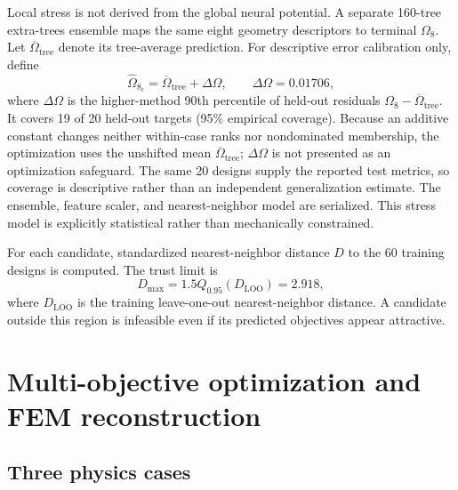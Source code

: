 \documentclass[11pt]{article}
\newcommand{\Om}{\Omega_{8}}
\begin{document}
Local stress is not derived from the global neural potential. A separate 160-tree extra-trees ensemble maps the same eight geometry descriptors to terminal $\Om$. Let $\overline\Omega_{\mathrm{tree}}$ denote its tree-average prediction. For descriptive error calibration only, define
\begin{equation}
\widehat\Om_{c}=\overline\Omega_{\mathrm{tree}}+\Delta\Omega,
\qquad \Delta\Omega=0.01706,
\label{eq:conservative_stress}
\end{equation}
where $\Delta\Omega$ is the higher-method 90th percentile of held-out residuals $\Omega_8-\overline\Omega_{\mathrm{tree}}$. It covers 19 of 20 held-out targets (95\% empirical coverage). Because an additive constant changes neither within-case ranks nor nondominated membership, the optimization uses the unshifted mean $\overline\Omega_{\mathrm{tree}}$; $\Delta\Omega$ is not presented as an optimization safeguard. The same 20 designs supply the reported test metrics, so coverage is descriptive rather than an independent generalization estimate. The ensemble, feature scaler, and nearest-neighbor model are serialized. This stress model is explicitly statistical rather than mechanically constrained.

For each candidate, standardized nearest-neighbor distance $D$ to the 60 training designs is computed. The trust limit is
\begin{equation}
D_{\max}=1.5Q_{0.95}(D_{\mathrm{LOO}})=2.918,
\label{eq:trust}
\end{equation}
where $D_{\mathrm{LOO}}$ is the training leave-one-out nearest-neighbor distance. A candidate outside this region is infeasible even if its predicted objectives appear attractive.

\section{Multi-objective optimization and FEM reconstruction}

\subsection{Three physics cases}
\end{document}
